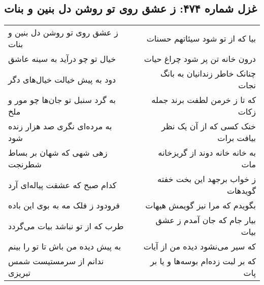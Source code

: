 \begin{center}
\section*{غزل شماره ۴۷۴: ز عشق روی تو روشن دل بنین و بنات}
\label{sec:0474}
\begin{longtable}{l p{0.5cm} r}
ز عشق روی تو روشن دل بنین و بنات
&&
بیا که از تو شود سیئاتهم حسنات
\\
خیال تو چو درآید به سینه عاشق
&&
درون خانه تن پر شود چراغ حیات
\\
دود به پیش خیالت خیال‌های دگر
&&
چنانک خاطر زندانیان به بانگ نجات
\\
به گرد سنبل تو جان‌ها چو مور و ملخ
&&
که تا ز خرمن لطفت برند جمله زکات
\\
به مرده‌ای نگری صد هزار زنده شود
&&
خنک کسی که از آن یک نظر بیافت برات
\\
زهی شهی که شهان بر بساط شطرنجت
&&
به خانه خانه دوند از گریزخانه مات
\\
کدام صبح که عشقت پیاله‌ای آرد
&&
ز خواب برجهد این بخت خفته گویدهات
\\
فرودود ز فلک مه به بوی این باده
&&
بگویدم که مرا نیز گویمش هیهات
\\
طرب که از تو نباشد بیات می‌گردد
&&
بیار جام که جان آمدم ز عشق بیات
\\
به پیش دیده من باش تا تو را بینم
&&
که سیر می‌نشود دیده من از آیات
\\
ندانم از سرمستیست شمس تبریزی
&&
که بر لبت زده‌ام بوسه‌ها و یا بر پات
\\
\end{longtable}
\end{center}
